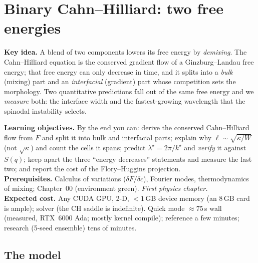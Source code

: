 \chapter{Binary Cahn--Hilliard: two free energies}
\label{ch:p1}

\begin{keybox}
\textbf{Key idea.} A blend of two components lowers its free energy by
\emph{demixing}. The Cahn--Hilliard equation is the conserved gradient
flow of a Ginzburg--Landau free energy; that free energy can only
decrease in time, and it splits into a \emph{bulk} (mixing) part and an
\emph{interfacial} (gradient) part whose competition sets the
morphology. Two quantitative predictions fall out of the same free
energy and we \emph{measure} both: the interface width and the
fastest-growing wavelength that the spinodal instability selects.
\end{keybox}

\begin{keybox}
\textbf{Learning objectives.} By the end you can: derive the conserved
Cahn--Hilliard flow from $F$ and split it into bulk and interfacial
parts; explain why $\ell\sim\sqrt{\kappa/W}$ (not $\sqrt\kappa$) and count
the cells it spans; predict $\lambda^\star=2\pi/k^\star$ and \emph{verify}
it against $S(q)$; keep apart the three ``energy decreases'' statements
and measure the last two; and report the cost of the Flory--Huggins
projection.\\[2pt]
\textbf{Prerequisites.} Calculus of variations ($\delta F/\delta c$),
Fourier modes, thermodynamics of mixing; Chapter~00 (environment green).
\emph{First physics chapter.}\\[2pt]
\textbf{Expected cost.} Any CUDA GPU, 2-D, $<1$\,GB device memory (an
8\,GB card is ample); solver  (the CH saddle is indefinite).
Quick mode $\approx75$\,s wall (measured, RTX~6000 Ada; mostly kernel
compile); reference a few minutes; research (5-seed ensemble) tens of
minutes.
\end{keybox}

\section{The model}

